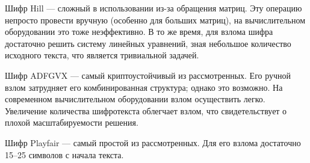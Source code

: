 \documentclass[a4paper, 14pt]{extarticle}
\begin{document}
Шифр Hill --- сложный в использовании из-за обращения матриц. Эту операцию непросто провести вручную (особенно для больших матриц), на вычислительном оборудовании это тоже неэффективно. В то же время, для взлома шифра достаточно решить систему линейных уравнений, зная небольшое количество исходного текста, что является тривиальной задачей.

Шифр ADFGVX --- самый криптоустойчивый из рассмотренных. Его ручной взлом затрудняет его комбинированная структура; однако это возможно. На современном вычислительном оборудовании взлом осуществить легко. Увеличение количества шифротекста облегчает взлом, что свидетельствует о плохой масштабируемости решения.

Шифр Playfair --- самый простой из рассмотренных. Для его взлома достаточно 15--25 символов с начала текста.
\end{document}
